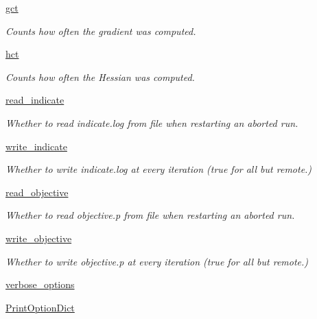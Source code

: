 \begin{DoxyCompactItemize}
\hyperlink{classforcebalance_1_1target_1_1Target_aa625ac88c6744eb14ef281d9496d0dbb}{gct}
\begin{DoxyCompactList}\small\item\em Counts how often the gradient was computed. \end{DoxyCompactList}\item 
\hyperlink{classforcebalance_1_1target_1_1Target_a5b5a42f78052b47f29ed4b940c6111a1}{hct}
\begin{DoxyCompactList}\small\item\em Counts how often the Hessian was computed. \end{DoxyCompactList}\item 
\hyperlink{classforcebalance_1_1target_1_1Target_aa8af57d5be669c4bb1c0cfd4b7a9220e}{read\-\_\-indicate}
\begin{DoxyCompactList}\small\item\em Whether to read indicate.\-log from file when restarting an aborted run. \end{DoxyCompactList}\item 
\hyperlink{classforcebalance_1_1target_1_1Target_a3a2f5d4bbb8d6ecb580eadb261977a57}{write\-\_\-indicate}
\begin{DoxyCompactList}\small\item\em Whether to write indicate.\-log at every iteration (true for all but remote.) \end{DoxyCompactList}\item 
\hyperlink{classforcebalance_1_1target_1_1Target_a22bdc4bbce2020ae44b44ad3e444fda6}{read\-\_\-objective}
\begin{DoxyCompactList}\small\item\em Whether to read objective.\-p from file when restarting an aborted run. \end{DoxyCompactList}\item 
\hyperlink{classforcebalance_1_1target_1_1Target_a7a95624dfe03f0cee0e5f1ae09db306a}{write\-\_\-objective}
\begin{DoxyCompactList}\small\item\em Whether to write objective.\-p at every iteration (true for all but remote.) \end{DoxyCompactList}\item 
\hyperlink{classforcebalance_1_1BaseClass_afd68efa29ccd2f320f4cf82198214aac}{verbose\-\_\-options}
\item 
\hyperlink{classforcebalance_1_1BaseClass_afc6659278497d7245bc492ecf405ccae}{Print\-Option\-Dict}
\end{DoxyCompactItemize}


